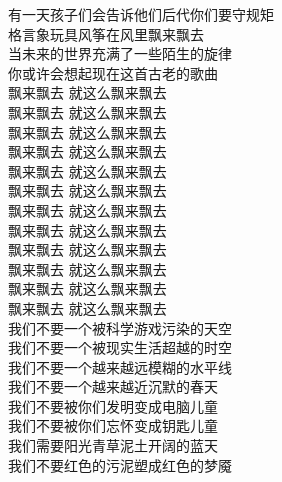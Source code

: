 \begin{songs}{}
	\vspace{2ex}
	有一天孩子们会告诉他们后代你们要守规矩	\\
	格言象玩具风筝在风里飘来飘去	\\
	当未来的世界充满了一些陌生的旋律	\\
	你或许会想起现在这首古老的歌曲	\\
	\vspace{2ex}
	飘来飘去 \hspace{5mm} 就这么飘来飘去	\\
	飘来飘去 \hspace{5mm} 就这么飘来飘去	\\
	飘来飘去 \hspace{5mm} 就这么飘来飘去	\\
	飘来飘去 \hspace{5mm} 就这么飘来飘去	\\
	飘来飘去 \hspace{5mm} 就这么飘来飘去	\\
	飘来飘去 \hspace{5mm} 就这么飘来飘去	\\
	飘来飘去 \hspace{5mm} 就这么飘来飘去	\\
	飘来飘去 \hspace{5mm} 就这么飘来飘去	\\
	飘来飘去 \hspace{5mm} 就这么飘来飘去	\\
	飘来飘去 \hspace{5mm} 就这么飘来飘去	\\
	飘来飘去 \hspace{5mm} 就这么飘来飘去	\\
	飘来飘去 \hspace{5mm} 就这么飘来飘去	\\
	\vspace{2ex}	
	我们不要一个被科学游戏污染的天空	\\
	我们不要一个被现实生活超越的时空	\\
	我们不要一个越来越远模糊的水平线	\\
	我们不要一个越来越近沉默的春天	\\
	我们不要被你们发明变成电脑儿童	\\
	我们不要被你们忘怀变成钥匙儿童	\\
	\vspace{2ex}
	我们需要阳光青草泥土开阔的蓝天	\\
	我们不要红色的污泥塑成红色的梦魇	\\
  \endsong
\end{songs}

